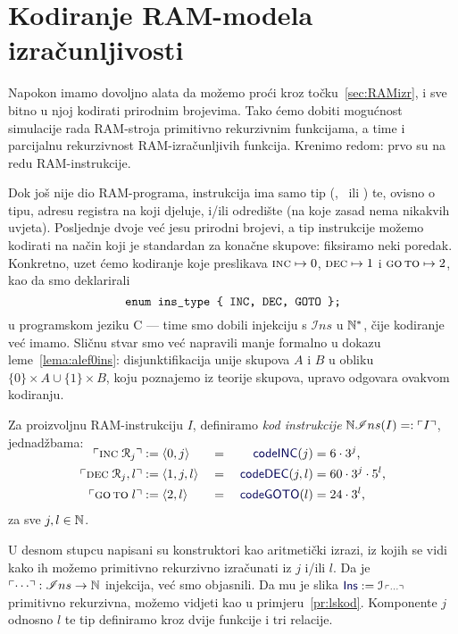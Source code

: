 \section{Kodiranje RAM-modela izračunljivosti}

Napokon imamo dovoljno alata da možemo proći kroz točku~\ref{sec:RAMizr}, i sve bitno u njoj kodirati prirodnim brojevima. Tako ćemo dobiti mogućnost simulacije rada RAM-stroja primitivno rekurzivnim funkcijama, a time i parcijalnu rekurzivnost RAM-izračunljivih funkcija. Krenimo redom: prvo su na redu RAM-instrukcije.


Dok još nije dio RAM-programa, instrukcija ima samo tip (\inc, \dec\ ili \goto) te, ovisno o tipu, adresu registra na koji djeluje, i\slash ili odredište (na koje zasad nema nikakvih uvjeta). Posljednje dvoje već jesu prirodni brojevi, a tip instrukcije možemo kodirati na način koji je standardan za konačne skupove: fiksiramo neki poredak. Konkretno, uzet ćemo kodiranje koje preslikava $\textsc{inc}\mapsto0$, $\textsc{dec}\mapsto1$ i $\textsc{go\,to}\mapsto2$, kao da smo deklarirali
\begin{equation}\label{eq:enumIns}
\texttt{enum ins\_type \string{ INC, DEC, GOTO \string};}
\end{equation}
u programskom jeziku C --- time smo dobili injekciju s $\mathscr Ins$ u ${\mathbb N}^*$, čije kodiranje već imamo. Sličnu stvar smo već napravili manje formalno u dokazu leme~\ref{lema:alef0ins}: disjunktifikacija unije skupova $A$ i $B$ u obliku $\{0\}\times A\cup\{1\}\times B$, koju poznajemo iz teorije skupova, upravo odgovara ovakvom kodiranju.

\begin{definicija}[{name=[kodiranje skupa $\mathscr Ins$]}]\label{def:kodIns}
    Za proizvoljnu RAM-instrukciju $I$, definiramo \emph{kod instrukcije} ${\mathbb N}\mathscr Ins(I)=:\ulcorner I\urcorner$, jednadžbama:
\begin{alignat*}{3}
\SwapAboveDisplaySkip
    \kins{\incr j}&:=\langle0,j\rangle&\;=\;&&\f{codeINC}(j)&=6\cdot3^j\text,\\
    \kins{\decr jl}&:=\langle1,j,l\rangle&\;=\;&&\f{codeDEC}(j,l)&=60\cdot3^j\cdot5^l\text,\\
    \kins{\goto\;l}&:=\langle2,l\rangle&\;=\;&&\f{codeGOTO}(l)&=24\cdot3^l\text,
\end{alignat*}
za sve $j,l\in{\mathbb N}$.
\end{definicija}
U desnom stupcu napisani su konstruktori kao aritmetički izrazi, iz kojih se vidi kako ih možemo primitivno rekurzivno izračunati iz $j$ i\slash ili $l$. Da je $\ulcorner\cdots\urcorner:\mathscr Ins\to{\mathbb N}$ injekcija, već smo objasnili. Da mu je slika $\f{Ins}:=\im{\,\kins{\cdots}}$ primitivno rekurzivna, možemo vidjeti kao u primjeru~\ref{pr:lskod}.
Komponente $j$ odnosno $l$ te tip definiramo kroz dvije funkcije i tri relacije.

